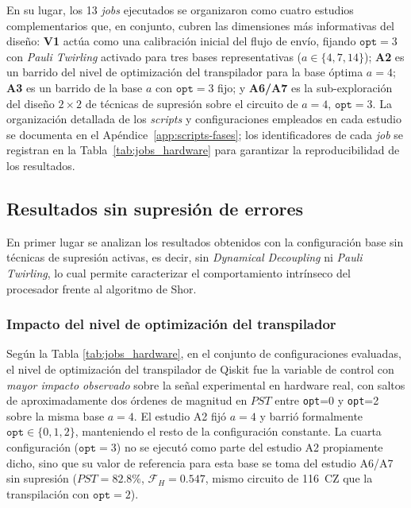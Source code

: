 \documentclass[12pt, spanish]{book}
\begin{document}
En su lugar, los 13 \textit{jobs} ejecutados se organizaron como cuatro estudios complementarios que, en conjunto, cubren las dimensiones más informativas del diseño: \textbf{V1} actúa como una calibración inicial del flujo de envío, fijando $\texttt{opt}=3$ con \textit{Pauli Twirling} activado para tres bases representativas ($a \in \{4, 7, 14\}$); \textbf{A2} es un barrido del nivel de optimización del transpilador para la base óptima $a = 4$; \textbf{A3} es un barrido de la base $a$ con $\texttt{opt}=3$ fijo; y \textbf{A6/A7} es la sub-exploración del diseño $2 \times 2$ de técnicas de supresión sobre el circuito de $a = 4$, $\texttt{opt}=3$. La organización detallada de los \textit{scripts} y configuraciones empleados en cada estudio se documenta en el Apéndice~\ref{app:scripts-fases}; los identificadores de cada \textit{job} se registran en la Tabla~\ref{tab:jobs_hardware} para garantizar la reproducibilidad de los resultados.

\subsection{Resultados sin supresión de errores}
\label{subsec:resultados_crudos_hw}

En primer lugar se analizan los resultados obtenidos con la configuración base sin técnicas de supresión activas, es decir, sin \textit{Dynamical Decoupling} ni \textit{Pauli Twirling}, lo cual permite caracterizar el comportamiento intrínseco del procesador frente al algoritmo de Shor.

\subsubsection{Impacto del nivel de optimización del transpilador}

Según la Tabla \ref{tab:jobs_hardware}, en el conjunto de configuraciones evaluadas, el nivel de optimización del transpilador de Qiskit fue la variable de control con \emph{mayor impacto observado} sobre la señal experimental en hardware real, con saltos de aproximadamente dos órdenes de magnitud en $PST$ entre \texttt{opt}=0 y \texttt{opt}=2 sobre la misma base $a=4$. El estudio A2 fijó $a = 4$ y barrió formalmente $\texttt{opt} \in \{0, 1, 2\}$, manteniendo el resto de la configuración constante. La cuarta configuración ($\texttt{opt}=3$) no se ejecutó como parte del estudio A2 propiamente dicho, sino que su valor de referencia para esta base se toma del estudio A6/A7 sin supresión ($PST = 82.8\%$, $\mathcal{F}_H = 0.547$, mismo circuito de 116~CZ que la transpilación con $\texttt{opt}=2$).\\
\end{document}
